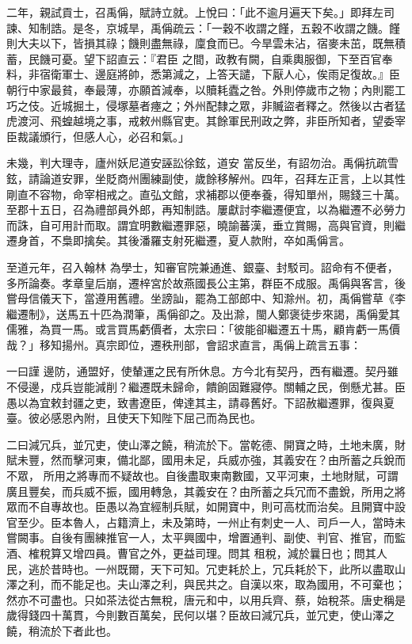 \begin{pinyinscope}
 二年，親試貢士，召禹偁，賦詩立就。上悅曰：「此不逾月遍天下矣。」即拜左司諫、知制誥。是冬，京城旱，禹偁疏云：「一穀不收謂之饉，五穀不收謂之饑。饉則大夫以下，皆損其祿；饑則盡無祿，廩食而已。今旱雲未沾，宿麥未茁，既無積蓄，民饑可憂。望下詔直云：『君臣
 之間，政教有闕，自乘輿服御，下至百官奉料，非宿衛軍士、邊庭將帥，悉第減之，上答天譴，下厭人心，俟雨足復故。』臣朝行中家最貧，奉最薄，亦願首減奉，以贖耗蠹之咎。外則停歲市之物；內則罷工巧之伎。近城掘土，侵塚墓者瘞之；外州配隸之眾，非贓盜者釋之。然後以古者猛虎渡河、飛蝗越境之事，戒敕州縣官吏。其餘軍民刑政之弊，非臣所知者，望委宰臣裁議頒行，但感人心，必召和氣。」



 未幾，判大理寺，廬州妖尼道安誣訟徐鉉，道安
 當反坐，有詔勿治。禹偁抗疏雪鉉，請論道安罪，坐貶商州團練副使，歲餘移解州。四年，召拜左正言，上以其性剛直不容物，命宰相戒之。直弘文館，求補郡以便奉養，得知單州，賜錢三十萬。至郡十五日，召為禮部員外郎，再知制誥。屢獻討李繼遷便宜，以為繼遷不必勞力而誅，自可用計而取。謂宜明數繼遷罪惡，曉諭蕃漢，垂立賞賜，高與官資，則繼遷身首，不梟即擒矣。其後潘羅支射死繼遷，夏人款附，卒如禹偁言。



 至道元年，召入翰林
 為學士，知審官院兼通進、銀臺、封駁司。詔命有不便者，多所論奏。孝章皇后崩，遷梓宮於故燕國長公主第，群臣不成服。禹偁與客言，後嘗母信儀天下，當遵用舊禮。坐謗訕，罷為工部郎中、知滁州。初，禹偁嘗草《李繼遷制》，送馬五十匹為潤筆，禹偁卻之。及出滁，閩人鄭褒徒步來謁，禹偁愛其儒雅，為買一馬。或言買馬虧價者，太宗曰：「彼能卻繼遷五十馬，顧肯虧一馬價哉？」移知揚州。真宗即位，遷秩刑部，會詔求直言，禹偁上疏言五事：



 一曰謹
 邊防，通盟好，使輦運之民有所休息。方今北有契丹，西有繼遷。契丹雖不侵邊，戍兵豈能減削？繼遷既未歸命，饋餉固難寢停。關輔之民，倒懸尤甚。臣愚以為宜敕封疆之吏，致書遼臣，俾達其主，請尋舊好。下詔赦繼遷罪，復與夏臺。彼必感恩內附，且使天下知陛下屈己而為民也。



 二曰減冗兵，並冗吏，使山澤之饒，稍流於下。當乾德、開寶之時，土地未廣，財賦未豐，然而擊河東，備北鄙，國用未足，兵威亦強，其義安在？由所蓄之兵銳而不眾，
 所用之將專而不疑故也。自後盡取東南數國，又平河東，土地財賦，可謂廣且豐矣，而兵威不振，國用轉急，其義安在？由所蓄之兵冗而不盡銳，所用之將眾而不自專故也。臣愚以為宜經制兵賦，如開寶中，則可高枕而治矣。且開寶中設官至少。臣本魯人，占籍濟上，未及第時，一州止有刺史一人、司戶一人，當時未嘗闕事。自後有團練推官一人，太平興國中，增置通判、副使、判官、推官，而監酒、榷稅算又增四員。曹官之外，更益司理。問其
 租稅，減於曩日也；問其人民，逃於昔時也。一州既爾，天下可知。冗吏耗於上，冗兵耗於下，此所以盡取山澤之利，而不能足也。夫山澤之利，與民共之。自漢以來，取為國用，不可棄也；然亦不可盡也。只如茶法從古無稅，唐元和中，以用兵齊、蔡，始稅茶。唐史稱是歲得錢四十萬貫，今則數百萬矣，民何以堪？臣故曰減冗兵，並冗吏，使山澤之饒，稍流於下者此也。




\end{pinyinscope}
